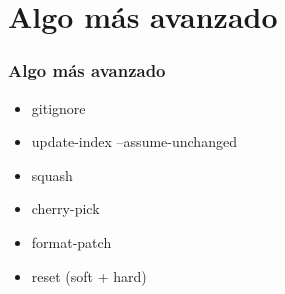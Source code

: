 \section{Algo más avanzado}
\frame
{
\frametitle{Algo más avanzado}
\begin{itemize}
 \item gitignore
 \item update-index --assume-unchanged
 \item squash
 \item cherry-pick
 \item format-patch
 \item reset (soft + hard)
\end{itemize}
}
